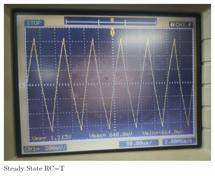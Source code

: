 \documentclass[12pt,a4paper]{report}
\begin{document}
\begin{itemize}
\begin{figure}[H]
\begin{minipage}[c]{0.48\textwidth}
    \end{minipage}
    \hfill
    \begin{minipage}[c]{0.48\textwidth}
        \includegraphics[width=\textwidth]{figs/sr1.jpg} %
        
    \end{minipage}
    \caption{Steady State RC=T}
    \label{fig:CRO-patterns}
\end{figure}
\end{itemize}
\end{document}
